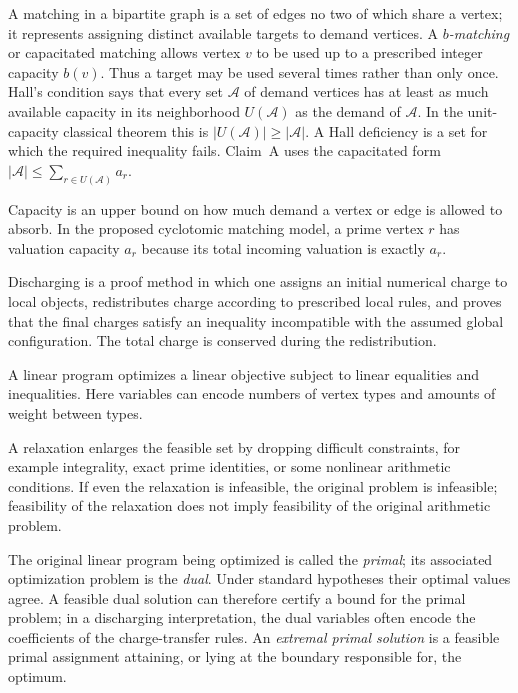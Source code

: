\documentclass[11pt]{article}
\theoremstyle{definition}
\theoremstyle{remark}
\begin{document}
\begin{description}[style=nextline,leftmargin=1.5em]
\item[Matching, Hall condition, and Hall deficiency.]
A matching in a bipartite graph is a set of edges no two of which share a
vertex; it represents assigning distinct available targets to demand
vertices.  A \emph{$b$-matching} or capacitated matching allows vertex $v$ to
be used up to a prescribed integer capacity $b(v)$.  Thus a target may be used
several times rather than only once.  Hall's condition says that every set
$\mathcal A$ of demand vertices has at least as much available capacity in
its neighborhood $U(\mathcal A)$ as the demand of $\mathcal A$.  In the
unit-capacity classical theorem this is $|U(\mathcal A)|\ge|\mathcal A|$.
A Hall deficiency is a set for which the required inequality fails.  Claim~A
uses the capacitated form $|\mathcal A|\le\sum_{r\in U(\mathcal A)}a_r$.

\item[Capacity.]
Capacity is an upper bound on how much demand a vertex or edge is allowed to
absorb.  In the proposed cyclotomic matching model, a prime vertex $r$ has
valuation capacity $a_r$ because its total incoming valuation is exactly
$a_r$.

\item[Discharging.]
Discharging is a proof method in which one assigns an initial numerical charge
to local objects, redistributes charge according to prescribed local rules,
and proves that the final charges satisfy an inequality incompatible with the
assumed global configuration.  The total charge is conserved during the
redistribution.

\item[Linear program (LP).]
A linear program optimizes a linear objective subject to linear equalities and
inequalities.  Here variables can encode numbers of vertex types and amounts
of weight between types.

\item[Relaxation.]
A relaxation enlarges the feasible set by dropping difficult constraints,
for example integrality, exact prime identities, or some nonlinear arithmetic
conditions.  If even the relaxation is infeasible, the original problem is
infeasible; feasibility of the relaxation does not imply feasibility of the
original arithmetic problem.

\item[Primal problem, LP duality, and dual certificate.]
The original linear program being optimized is called the \emph{primal}; its
associated optimization problem is the \emph{dual}.  Under standard
hypotheses their optimal values agree.  A feasible dual solution can therefore
certify a bound for the primal problem; in a discharging interpretation, the
dual variables often encode the coefficients of the charge-transfer rules.
An \emph{extremal primal solution} is a feasible primal assignment attaining,
or lying at the boundary responsible for, the optimum.


\end{description}
\end{document}
